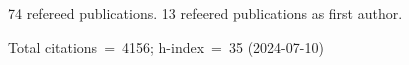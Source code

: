 74 refereed publications. 13 refeered publications as first author.

Total citations~=~4156; h-index~=~35 (2024-07-10)